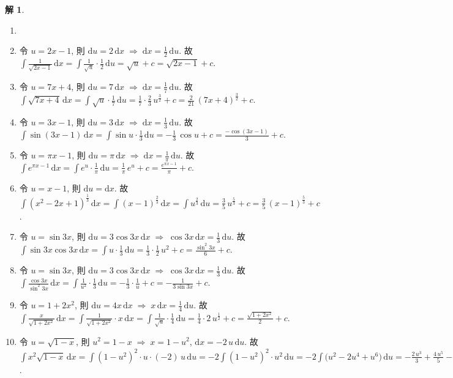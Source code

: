\documentclass[12pt]{extarticle}
\newcommand{\ds}{\displaystyle}
\newcommand{\ie}{\;\Longrightarrow\;}
\theoremstyle{definition}
\newtheorem*{sol}{解}
\begin{document}
\begin{sol}
  \begin{enumerate}\setlength{\itemsep}{0pt}
    \item[]
    \item 令 $u = 2x - 1$, 則 $\ds\text{d}u = 2\,\text{d}x\ie \text{d}x = \frac{1}{2}\,\text{d}u$. 故 $\ds\int\!\frac{1}{\sqrt{2 x - 1}}\,\text{d}x = \int\!\frac{1}{\sqrt{u}}\cdot\frac{1}{2}\,\text{d}u = \sqrt{u} + c = \sqrt{2 x - 1} + c$. 
    \item 令 $u = 7x + 4$, 則 $\ds\text{d}u = 7\,\text{d}x\ie \text{d}x = \frac{1}{7}\,\text{d}u$. 故 $\ds\int\!\sqrt{7 x + 4}\,\text{d}x = \int\!\sqrt{u}\cdot\frac{1}{7}\,\text{d}u = \frac{1}{7}\cdot\frac{2}{3}\,u^{\frac{3}{2}} + c = \frac{2}{21}\,(7 x + 4)^{\frac{3}{2}} + c$. 
    \item 令 $u = 3x - 1$, 則 $\ds\text{d}u = 3\,\text{d}x\ie \text{d}x = \frac{1}{3}\,\text{d}u$. 故 $\ds\int\!\sin(3 x - 1)\,\text{d}x = \int\!\sin{u}\cdot\frac{1}{3}\,\text{d}u = -\frac{1}{3}\,\cos{u} + c = \frac{-\cos(3x - 1)}{3} + c$. 
    \item 令 $u = \pi x - 1$, 則 $\ds\text{d}u = \pi\,\text{d}x\ie \text{d}x = \frac{1}{\pi}\,\text{d}u$. 故 $\ds\int\!e^{\pi x - 1}\,\text{d}x = \int\!e^u\cdot\frac{1}{\pi}\,\text{d}u = \frac{1}{\pi}\,e^{u} + c = \frac{e^{\pi x - 1}}{\pi} + c$. 
    \item 令 $\ds u = x - 1$, 則 $\ds\text{d}u = \text{d}x$. 故 $\ds\int\!(x^2 - 2x + 1)^{\frac{1}{3}}\,\text{d}x = \int\!(x - 1)^\frac{2}{3}\,\text{d}x = \int\!u^\frac{2}{3}\,\text{d}u = \frac{3}{5}\,u^\frac{5}{3} + c = \frac{3}{5}\,(x - 1)^\frac{5}{3} + c$. 
    \item 令 $\ds u = \sin 3x$, 則 $\ds\text{d}u = 3\cos 3x\,\text{d}x\ie\cos 3x\,\text{d}x = \frac{1}{3}\,\text{d}u$. 故 $\ds\int\!\sin 3x\cos 3x\,\text{d}x = \int\!u\cdot\frac{1}{3}\,\text{d}u = \frac{1}{3}\cdot\frac{1}{2}\,u^2 + c = \frac{\sin^2 3x}{6} + c$. 
    \item 令 $\ds u = \sin 3x$, 則 $\ds\text{d}u = 3\cos 3x\,\text{d}x\ie\cos 3x\,\text{d}x = \frac{1}{3}\,\text{d}u$. 故 $\ds\int\!\frac{\cos 3x}{\sin^2 3x}\,\text{d}x = \int\!\frac{1}{u^2}\cdot\frac{1}{3}\,\text{d}u = -\frac{1}{3}\cdot\frac{1}{u} + c = -\frac{1}{3\sin 3x} + c$. 
    \item 令 $\ds u = 1 + 2x^2$, 則 $\ds\text{d}u = 4x\,\text{d}x\ie x\,\text{d}x = \frac{1}{4}\,\text{d}u$. 故 $\ds\int\!\frac{x}{\sqrt{1 + 2x^2}}\,\text{d}x = \int\!\frac{1}{\sqrt{1 + 2x^2}}\cdot x\,\text{d}x = \int\!\frac{1}{\sqrt{u}}\cdot\frac{1}{4}\,\text{d}u = \frac{1}{4}\cdot 2\,u^\frac{1}{2} + c = \frac{\sqrt{1 + 2x^2}}{2} + c$. 
    \item 令 $\ds u = \sqrt{1 - x}$, 則 $\ds u^2 = 1 - x\ie x = 1 - u^2$, $\text{d}x = -2\,u\,\text{d}u$. 故 $\ds\int\!x^2\sqrt{1 - x}\,\text{d}x = \int\!(1 - u^2)^2\cdot u\cdot(-2)\,u\,\text{d}u = -2\int\!(1 - u^2)^2\cdot u^2\,\text{d}u = -2\int\!\big(u^2 - 2u^4 + u^6\big)\,\text{d}u = -\frac{2\,u^3}{3} + \frac{4\,u^5}{5} - \frac{2\,u^7}{7} + c = -\frac{2\,(1 - x)^{\frac{3}{2}}}{3} + \frac{4\,(1 - x)^{\frac{5}{2}}}{5} - \frac{2\,(1 - x)^{\frac{7}{2}}}{7}$. 
  \end{enumerate}
\end{sol}
\end{document}
